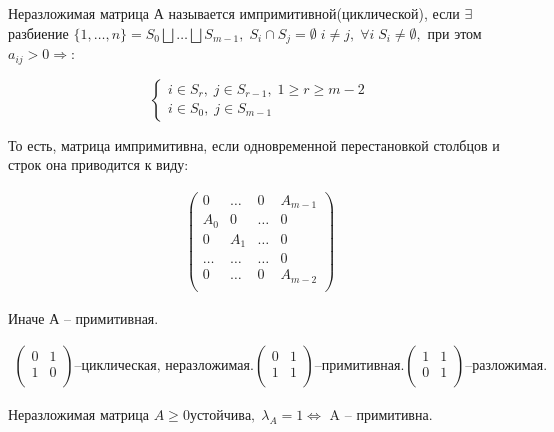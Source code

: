 \begin{definition}
	Неразложимая матрица А называется импримитивной(циклической), если $\exists$ разбиение $\{ 1, \ldots, n\} = S_0 \bigsqcup \ldots \bigsqcup S_{m - 1}, \; S_i \cap S_j = \emptyset \; i \neq j, \; \forall i \; S_i \neq \emptyset, $ при этом $a_{ij} > 0 \Rightarrow$:

	$$\begin{cases}
		i \in S_r, \; j \in S_{r - 1}, \; 1 \geq r \geq m - 2 \\
		i \in S_0, \; j \in S_{m - 1}
	\end{cases}$$

	То есть, матрица импримитивна, если одновременной перестановкой столбцов и строк она приводится к виду: 

	\begin{gather*}
		\begin{pmatrix}
		  0 & \ldots & 0 & A_{m-1}\\
		  A_0 & 0 & \ldots & 0\\
		  0 & A_1 & \ldots & 0\\
		  \ldots & \ldots & \ldots & 0\\
		  0 & \ldots & 0 &  A_{m-2}\\
		\end{pmatrix}
	\end{gather*}

	Иначе А -- примитивная.
\end{definition}

\begin{example}
		\begin{gather*}
			\begin{pmatrix}
			  0 & 1\\
			  1 & 0 \\
			\end{pmatrix} \text{--циклическая, неразложимая.}
			\begin{pmatrix}
			  0 & 1\\
			  1 & 1 \\
			\end{pmatrix} \text{--примитивная.}
			\begin{pmatrix}
			  1 & 1\\
			  0 & 1 \\
			\end{pmatrix} \text{--разложимая.}
		\end{gather*}
\end{example}

\begin{theorem}
	Неразложимая матрица $A \geq 0 устойчива, \; \lambda_A = 1 \Longleftrightarrow $ A -- примитивна.
\end{theorem}

